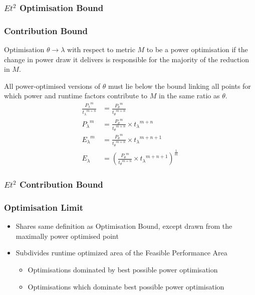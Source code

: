 \documentclass{beamer}
\begin{document}
  \begin{frame}
    \frametitle{$Et^2$ Optimisation Bound}
    \newcommand*{\OPTBOUND}{}%
    \begin{figure}
    \centering
    
    \end{figure}
  \end{frame}

  \begin{frame}
    \frametitle{Contribution Bound}
    \begin{definition}
      Optimisation $\theta \to \lambda$ with respect to metric $M$ to be a power optimisation if the change in power draw it delivers is responsible for the majority of the reduction in $M$. 
      \end{definition}
 All power-optimised versions of $\theta$ must lie below the bound linking all points for which power and runtime factors contribute to $M$ in the same ratio as $\theta$.
\begin{align}
\frac{{P_{\lambda}}^m}{{t_{\lambda}}^{m+n}} &= \frac{{P_{\theta}}^m}{{t_{\theta}}^{m+n}} \nonumber \\
 {P_{\lambda}}^m &= \frac{{P_{\theta}}^m}{{t_{\theta}}^{m+n}} \times {t_\lambda}^{m+n} \nonumber \\ 
 {E_{\lambda}}^m &= \frac{{P_{\theta}}^m}{{t_{\theta}}^{m+n}} \times {t_\lambda}^{m+n+1} \nonumber \\ 
  E_{\lambda} &= (\frac{{P_{\theta}}^m}{{t_{\theta}}^{m+n}} \times {t_\lambda}^{m+n+1})^{\frac{1}{m}} 
\end{align}
  \end{frame}

  \begin{frame}
    \frametitle{$Et^2$ Contribution Bound}
    \newcommand*{\OPTBOUND}{}%
    \newcommand*{\CONTBOUND}{}%
    \begin{figure}
    \centering
    
    \end{figure}
  \end{frame}


  \begin{frame}
    \frametitle{Optimisation Limit}
    \begin{itemize}
      \item Shares same definition as Optimisation Bound, except drawn from the maximally power optimised point
      \item Subdivides runtime optimized area of the Feasible Performance Area
      \begin{itemize}
        \item Optimisations dominated by best possible power optimisation
        \item Optimisations which dominate best possible power optimisation
      \end{itemize}
    \end{itemize}
  \end{frame}
\end{document}
